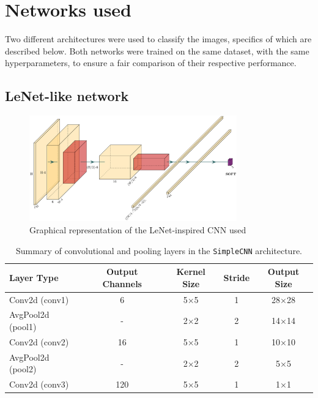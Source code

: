 \documentclass{pracalicmgr}
\begin{document}
\section{Networks used}

Two different architectures were used to classify the images, specifics of which are described below. Both networks were trained on the same dataset, with the same hyperparameters, to ensure a fair comparison of their respective performance.

\subsection{LeNet-like network}

\begin{figure}[H]
    \centering
    \includegraphics[width=0.8\textwidth]{src/LeNetLike.pdf}
    \caption{Graphical representation of the LeNet-inspired CNN used \cite{Iqbal2018PlotNeuralNet}}
    \label{fig:lenetLike_architecture}
\end{figure}

\begin{table}[H]
\centering
\caption{Summary of convolutional and pooling layers in the \texttt{SimpleCNN} architecture.}
\begin{tabular}{|l|c|c|c|c|}
\hline
\textbf{Layer Type} & \textbf{Output Channels} & \textbf{Kernel Size} & \textbf{Stride} & \textbf{Output Size} \\
\hline
Conv2d (conv1)       & 6   & 5×5 & 1 & 28×28 \\
AvgPool2d (pool1)    & -   & 2×2 & 2 & 14×14 \\
Conv2d (conv2)       & 16  & 5×5 & 1 & 10×10 \\
AvgPool2d (pool2)    & -   & 2×2 & 2 & 5×5 \\
Conv2d (conv3)       & 120 & 5×5 & 1 & 1×1 \\
\hline
\end{tabular}
\label{tab:simplecnn_layers}
\end{table}
\end{document}
